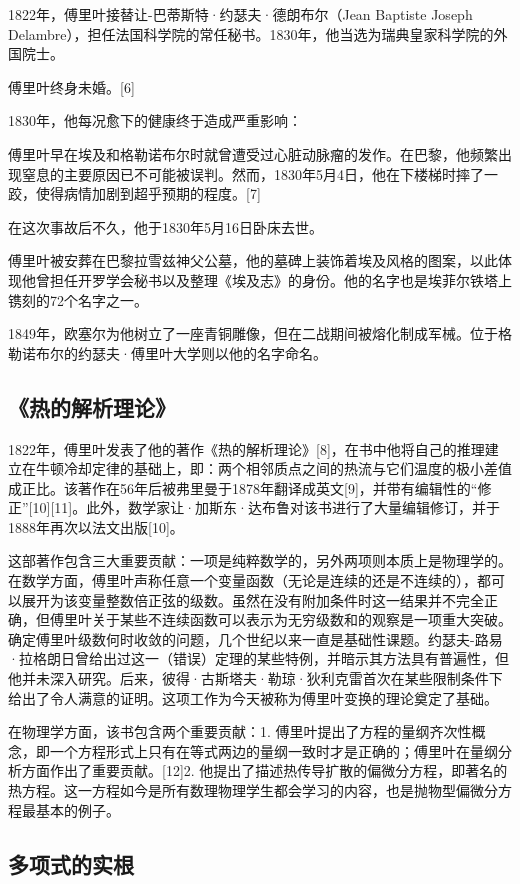 1822年，傅里叶接替让-巴蒂斯特·约瑟夫·德朗布尔（Jean Baptiste Joseph Delambre），担任法国科学院的常任秘书。1830年，他当选为瑞典皇家科学院的外国院士。

傅里叶终身未婚。[6]

1830年，他每况愈下的健康终于造成严重影响：

傅里叶早在埃及和格勒诺布尔时就曾遭受过心脏动脉瘤的发作。在巴黎，他频繁出现窒息的主要原因已不可能被误判。然而，1830年5月4日，他在下楼梯时摔了一跤，使得病情加剧到超乎预期的程度。[7]

在这次事故后不久，他于1830年5月16日卧床去世。

傅里叶被安葬在巴黎拉雪兹神父公墓，他的墓碑上装饰着埃及风格的图案，以此体现他曾担任开罗学会秘书以及整理《埃及志》的身份。他的名字也是埃菲尔铁塔上镌刻的72个名字之一。

1849年，欧塞尔为他树立了一座青铜雕像，但在二战期间被熔化制成军械。位于格勒诺布尔的约瑟夫·傅里叶大学则以他的名字命名。
\subsection{《热的解析理论》}
1822年，傅里叶发表了他的著作《热的解析理论》[8]，在书中他将自己的推理建立在牛顿冷却定律的基础上，即：两个相邻质点之间的热流与它们温度的极小差值成正比。该著作在56年后被弗里曼于1878年翻译成英文[9]，并带有编辑性的“修正”[10][11]。此外，数学家让·加斯东·达布鲁对该书进行了大量编辑修订，并于1888年再次以法文出版[10]。

这部著作包含三大重要贡献：一项是纯粹数学的，另外两项则本质上是物理学的。在数学方面，傅里叶声称任意一个变量函数（无论是连续的还是不连续的），都可以展开为该变量整数倍正弦的级数。虽然在没有附加条件时这一结果并不完全正确，但傅里叶关于某些不连续函数可以表示为无穷级数和的观察是一项重大突破。确定傅里叶级数何时收敛的问题，几个世纪以来一直是基础性课题。约瑟夫-路易·拉格朗日曾给出过这一（错误）定理的某些特例，并暗示其方法具有普遍性，但他并未深入研究。后来，彼得·古斯塔夫·勒琼·狄利克雷首次在某些限制条件下给出了令人满意的证明。这项工作为今天被称为傅里叶变换的理论奠定了基础。

在物理学方面，该书包含两个重要贡献：1. 傅里叶提出了方程的量纲齐次性概念，即一个方程形式上只有在等式两边的量纲一致时才是正确的；傅里叶在量纲分析方面作出了重要贡献。[12]2. 他提出了描述热传导扩散的偏微分方程，即著名的热方程。这一方程如今是所有数理物理学生都会学习的内容，也是抛物型偏微分方程最基本的例子。
\subsection{多项式的实根}
